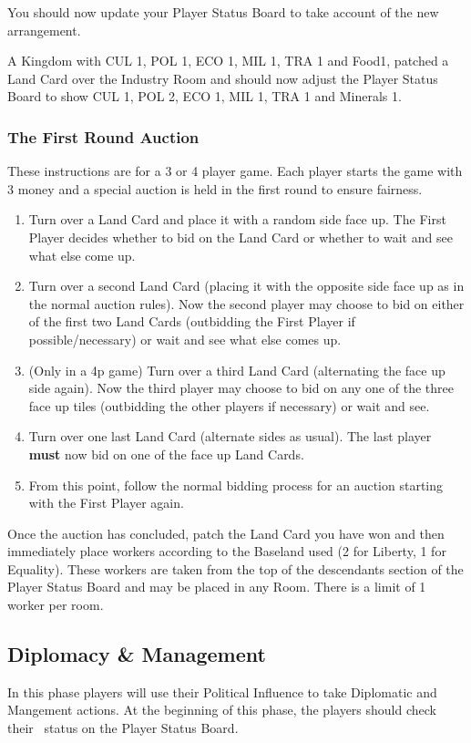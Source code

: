 \documentclass[10pt,twocolumn]{article}
\begin{document}
You should now update your Player Status Board to take account of the new arrangement.
\begin{BoxExample}A Kingdom with CUL 1, POL 1, ECO 1, MIL 1, TRA 1 and Food1, patched a Land Card over the Industry Room and should now adjust the Player Status Board to show CUL 1, POL 2, ECO 1, MIL 1, TRA 1 and Minerals 1.\end{BoxExample}


\subsubsection{The First Round Auction}
These instructions are for a 3 or 4 player game.
Each player starts the game with 3 money and a special auction is held in the first round to ensure fairness. 
\begin{enumerate}
\item Turn over a Land Card and place it with a random side face up. The First Player decides whether to bid on the Land Card or whether to wait and see what else come up.
\item Turn over a second Land Card (placing it with the opposite side face up as in the normal auction rules). Now the second player may choose to bid on either of the first two Land Cards (outbidding the First Player if possible/necessary) or wait and see what else comes up.
\item (Only in a 4p game) Turn over a third Land Card (alternating the face up side again). Now the third player may choose to bid on any one of the three face up tiles (outbidding the other players if necessary) or wait and see.
\item Turn over one last Land Card (alternate sides as usual). The last player \textbf{must} now bid on one of the face up Land Cards.
\item From this point, follow the normal bidding process for an auction starting with the First Player again.
\end{enumerate}
Once the auction has concluded, patch the Land Card you have won and then immediately place workers according to the Baseland used (2 for Liberty, 1 for Equality). These workers are taken from the top of the descendants section of the Player Status Board and may be placed in any Room. There is a limit of 1 worker per room.
\subsection{Diplomacy \& Management}
In this phase players will use their Political Influence to take Diplomatic and Mangement actions. At the beginning of this phase, the players should check their \pol\ status on the Player Status Board.
\end{document}
